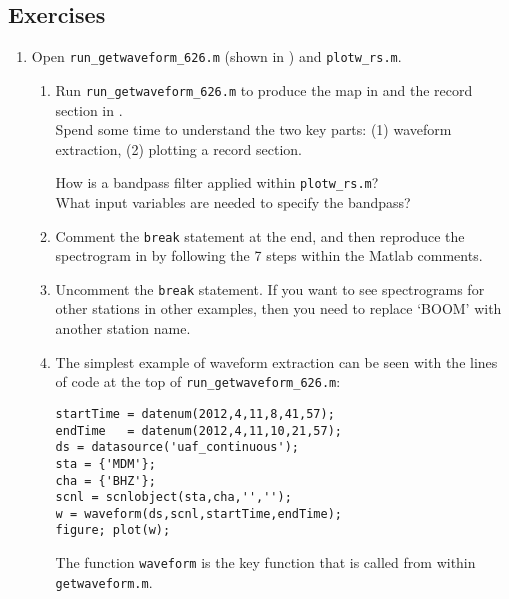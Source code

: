 \documentclass[11pt,titlepage,fleqn]{article}
\begin{document}

\subsection*{Exercises}

\begin{enumerate}

\item Open \verb+run_getwaveform_626.m+ (shown in ) and \verb+plotw_rs.m+.
%
\begin{enumerate}
\item Run \verb+run_getwaveform_626.m+ to produce the map in  and the record section in . \\
Spend some time to understand the two key parts: (1) waveform extraction, (2) plotting a record section.

How is a bandpass filter applied within \verb+plotw_rs.m+? \\
What input variables are needed to specify the bandpass?

\item Comment the \verb+break+ statement at the end, and then reproduce the spectrogram in  by following the 7 steps within the Matlab comments.

\item Uncomment the \verb+break+ statement. If you want to see spectrograms for other stations in other examples, then you need to replace `BOOM' with another station name.

\item The simplest example of waveform extraction can be seen with the lines of code at the top of \verb+run_getwaveform_626.m+:
%
\begin{spacing}{1.0}
\begin{verbatim}
startTime = datenum(2012,4,11,8,41,57);
endTime   = datenum(2012,4,11,10,21,57);
ds = datasource('uaf_continuous');
sta = {'MDM'};
cha = {'BHZ'};
scnl = scnlobject(sta,cha,'','');
w = waveform(ds,scnl,startTime,endTime);
figure; plot(w);
\end{verbatim}
\end{spacing}
%
The function \verb+waveform+ is the key function that is called from within \verb+getwaveform.m+.

\end{enumerate}



\end{enumerate}
\end{document}
